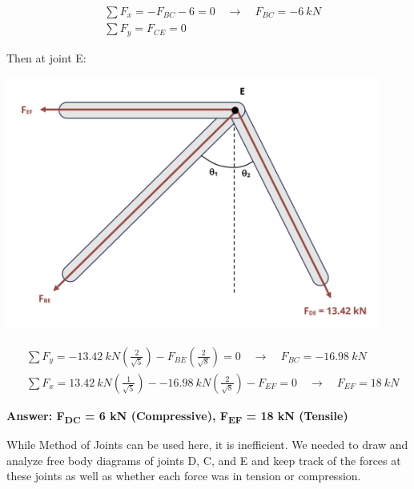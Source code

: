 \documentclass[
  letterpaper,
  DIV=11,
  numbers=noendperiod]{scrreprt}
\theoremstyle{definition}
\theoremstyle{remark}
\begin{document}
\begin{tcolorbox}
\begin{tcolorbox}
\[
\begin{aligned}
&\sum F_x=-F_{B C}-6=0 \quad\rightarrow\quad F_{B C}=-6{~kN}\\
&\sum F_y=F_{C E}=0
\end{aligned}
\]

Then at joint E:

\begin{center}
\includegraphics[width=4.84375in,height=\textheight]{images/CH1 PNGs/example 1.4 part 4.png}
\end{center}

\[
\begin{aligned}
&\sum F_y=-13.42{~kN}\left(\frac{2}{\sqrt{5}}\right)-F_{B E}\left(\frac{2}{\sqrt{8}}\right)=0 \quad\rightarrow\quad F_{B C}=-16.98{~kN}\\
&\sum F_x=13.42{~kN}\left(\frac{1}{\sqrt{5}}\right)--16.98{~kN}\left(\frac{2}{\sqrt{8}}\right)-F_{E F}=0 \quad\rightarrow\quad F_{E F}=18{~kN}
\end{aligned}
\]

\textbf{Answer: F\textsubscript{DC} = 6 kN (Compressive),
F\textsubscript{EF} = 18 kN (Tensile)}

\end{tcolorbox}

\begin{tcolorbox}[enhanced jigsaw, leftrule=.75mm, colbacktitle=quarto-callout-tip-color!10!white, breakable, opacityback=0, colback=white, titlerule=0mm, toprule=.15mm, colframe=quarto-callout-tip-color-frame, coltitle=black, title={Solution - Method of Sections}, toptitle=1mm, bottomrule=.15mm, rightrule=.15mm, left=2mm, arc=.35mm, opacitybacktitle=0.6, bottomtitle=1mm]

While Method of Joints can be used here, it is inefficient. We needed to
draw and analyze free body diagrams of joints D, C, and E and keep track
of the forces at these joints as well as whether each force was in
tension or compression.


\end{tcolorbox}
\end{tcolorbox}
\end{document}
